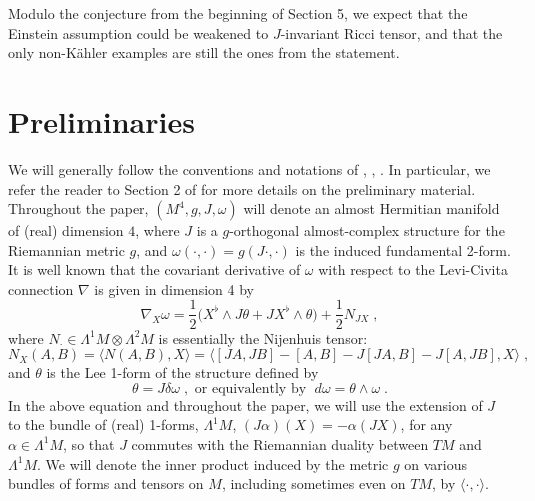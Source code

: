 \documentclass{amsart}
\begin{document}
\noindent
Modulo the conjecture from the beginning of Section 5, we expect that the Einstein assumption could be weakened to $J$-invariant Ricci tensor, and that the only non-K\"ahler examples are still the ones from the statement.


\section{Preliminaries} 
We will generally follow the conventions and notations of \cite{AAD},  \cite{AAD-AGAG}, \cite{AD-QJM}. In particular, we refer the reader to Section 2 of \cite{AAD} for more details on the preliminary material. 
Throughout the paper, $(M^4, g, J, \omega)$ will denote an almost Hermitian  manifold of (real) dimension $4$, where $J$ is a $g$-orthogonal almost-complex structure for the Riemannian metric $g$, and $\omega(\cdot, \cdot)= g(J\cdot,\cdot)$ is the induced fundamental 2-form. It is well known that the covariant derivative of $\omega$ with respect to the Levi-Civita connection $\nabla$ is given in dimension 4 by
\begin{equation} \label{nablaom-dim4}
\nabla_X \omega = \frac{1}{2} \big( X^{\flat} \wedge J\theta + JX^{\flat} \wedge \theta \big) + \frac{1}{2} N_{JX}  \; ,
\end{equation}
where $N_{\cdot} \in \Lambda^1 M \otimes \Lambda^2 M$ is essentially the Nijenhuis tensor:
\begin{equation} \label{Nij-def}
 N_X(A,B) = \langle N(A,B), X \rangle = \langle [JA,JB] - [A, B] - J[JA, B] - J[A, JB],   X \rangle  \; ,    
\end{equation}
and $\theta$ is the Lee 1-form of the structure defined by
\begin{equation} \label{theta-def}
 \theta = J\delta \omega \; , \mbox{ or equivalently by } \; d\omega = \theta \wedge \omega \; .
\end{equation}
In the above equation and throughout the paper, we will use the extension of $J$ to the bundle of (real) 1-forms, $\Lambda^1 M$, 
$(J\alpha)(X) = -\alpha(JX)$, for any $\alpha \in \Lambda^1 M$, so that $J$ commutes with the Riemannian duality between $TM$ and $\Lambda^1 M $. We will denote the inner product induced by the metric $g$ on various bundles of forms and tensors on $M$, including sometimes even on $TM$, by $\langle \cdot,\cdot \rangle$.
\end{document}
